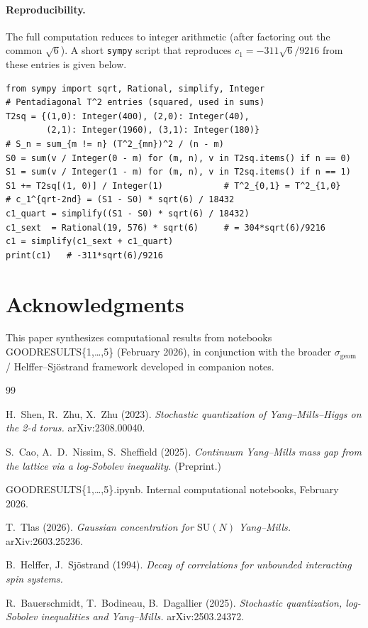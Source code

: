 \documentclass[11pt,a4paper]{article}
\theoremstyle{definition}
\newcommand{\SU}{\mathrm{SU}}
\begin{document}
\paragraph{Reproducibility.}
The full computation reduces to integer arithmetic (after factoring out
the common $\sqrt{6}$). A short \texttt{sympy} script that reproduces
$c_1 = -311\sqrt{6}/9216$ from these entries is given below.

\begin{verbatim}
from sympy import sqrt, Rational, simplify, Integer
# Pentadiagonal T^2 entries (squared, used in sums)
T2sq = {(1,0): Integer(400), (2,0): Integer(40),
        (2,1): Integer(1960), (3,1): Integer(180)}
# S_n = sum_{m != n} (T^2_{mn})^2 / (n - m)
S0 = sum(v / Integer(0 - m) for (m, n), v in T2sq.items() if n == 0)
S1 = sum(v / Integer(1 - m) for (m, n), v in T2sq.items() if n == 1)
S1 += T2sq[(1, 0)] / Integer(1)            # T^2_{0,1} = T^2_{1,0}
# c_1^{qrt-2nd} = (S1 - S0) * sqrt(6) / 18432
c1_quart = simplify((S1 - S0) * sqrt(6) / 18432)
c1_sext  = Rational(19, 576) * sqrt(6)     # = 304*sqrt(6)/9216
c1 = simplify(c1_sext + c1_quart)
print(c1)   # -311*sqrt(6)/9216
\end{verbatim}

\section*{Acknowledgments}

This paper synthesizes computational results from notebooks
GOODRESULTS\{1,\ldots,5\} (February 2026), in conjunction with the
broader $\sigma_{\mathrm{geom}}$ / Helffer--Sj\"ostrand framework
developed in companion notes.

\begin{thebibliography}{99}

 H.\ Shen, R.\ Zhu, X.\ Zhu (2023).
\emph{Stochastic quantization of Yang--Mills--Higgs on the 2-d torus.}
arXiv:2308.00040.

 S.\ Cao, A.\ D.\ Nissim, S.\ Sheffield
(2025). \emph{Continuum Yang--Mills mass gap from the lattice via a
log-Sobolev inequality.} (Preprint.)

 GOODRESULTS\{1,\ldots,5\}.ipynb. Internal
computational notebooks, February 2026.

 T.\ Tlas (2026). \emph{Gaussian concentration for
$\SU(N)$ Yang--Mills.} arXiv:2603.25236.

 B.\ Helffer, J.\ Sj\"ostrand (1994).
\emph{Decay of correlations for unbounded interacting spin systems.}

 R.\ Bauerschmidt, T.\ Bodineau, B.\ Dagallier (2025).
\emph{Stochastic quantization, log-Sobolev inequalities and Yang--Mills.}
arXiv:2503.24372.

\end{thebibliography}
\end{document}

